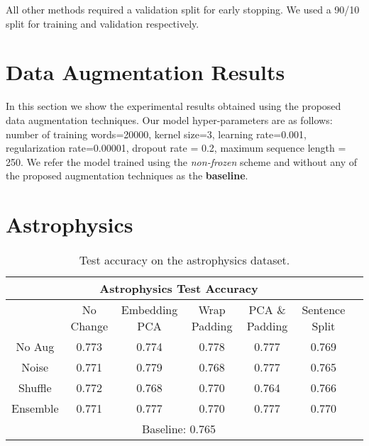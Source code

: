 All other methods required a validation split for early stopping. We used a 90/10 split for training and validation respectively.

\section{Data Augmentation Results}
In this section we show the experimental results obtained using the proposed data augmentation techniques. Our model hyper-parameters are as follows:
number of training words=20000, kernel size=3, learning rate=0.001, regularization rate=0.00001,
dropout rate = 0.2, maximum sequence length = 250. We refer the model trained using the \textit{non-frozen} scheme
and without any of the proposed augmentation techniques as the \textbf{baseline}.

\section{Astrophysics}
\begin{center}
\begin{table}[H]
\begin{tabular}{|c||c|c|c|c|c|c|}
 \hline
 \multicolumn{6}{|c|}{\textbf{Astrophysics Test Accuracy}}\\ \hline
  & No Change & Embedding PCA & Wrap Padding & PCA \& Padding & Sentence Split\\  \hline
  No Aug & 0.773 & 0.774 & 0.778 & 0.777 & 0.769 \\ \hline
  Noise &  0.771 & 0.779 & 0.768 & 0.777 & 0.765  \\  \hline
  Shuffle & 0.772 & 0.768 & 0.770 & 0.764 & 0.766 \\      \hline
  Ensemble & 0.771 & 0.777 &  0.770 & 0.777 & 0.770 \\      \hline
  \multicolumn{6}{|c|}{Baseline: 0.765}\\ \hline
  \end{tabular}
\caption{Test accuracy on the astrophysics dataset.}
\end{table}
  \end{center}

